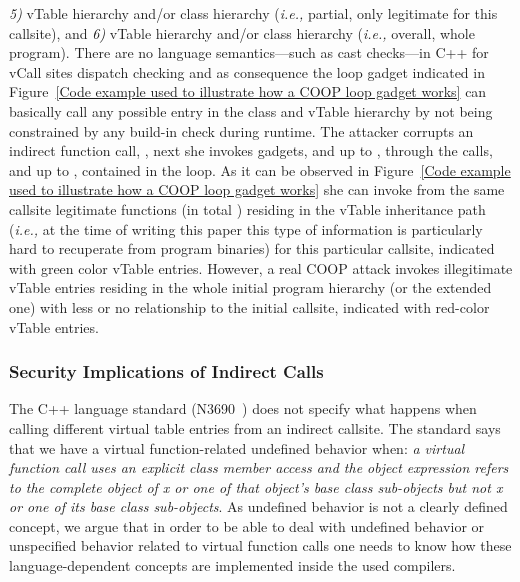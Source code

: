 \textit{5)} vTable hierarchy and/or class hierarchy (\textit{i.e.,} partial, only legitimate for this callsite), and
\textit{6)} vTable hierarchy and/or class hierarchy (\textit{i.e.,} overall, whole program).
There are no language semantics---such as cast checks---in C++ for vCall sites dispatch checking and as consequence
the loop gadget indicated in Figure~\ref{Code example used to illustrate how a COOP loop gadget works}
can basically call any possible entry in the class and vTable hierarchy by not being constrained by any build-in check during
runtime. The attacker corrupts an indirect function call, , 
next she invokes gadgets,  and  up to {\tiny{}}, 
through the calls,  and  up to {\tiny{}}, contained in the loop. 
As it can be observed in Figure~\ref{Code example used to illustrate how a COOP loop gadget works} she 
can invoke from the same callsite legitimate functions (in total {\tiny{}}) residing in the vTable inheritance path
(\textit{i.e.,} at the time of writing this paper this type of information is particularly hard to recuperate from program binaries)
for this particular callsite, indicated with green color vTable entries. 
However, a real COOP attack invokes illegitimate
vTable entries residing in the whole initial program hierarchy (or the extended one)
with less or no relationship to the initial callsite,
indicated with red-color vTable entries.

\subsubsection{Security Implications of Indirect Calls}
\label{Security Implications of Forbidden Forward Indirect Calls}
The C++ language standard (N3690~\cite{iso:iecN3690}) does not specify what happens when calling different virtual table entries from an indirect callsite. 
The standard says that we have a virtual function-related undefined behavior when: \textit{a virtual function call uses an explicit class member access and 
the object expression refers to the complete object of x or one of that object's base class sub-objects but not x or one of its base class sub-objects}. As 
undefined behavior is not a clearly defined concept, we argue that in order to be able to deal with undefined behavior or unspecified behavior related to 
virtual function calls one needs to know how these language-dependent concepts are implemented inside the used compilers.

